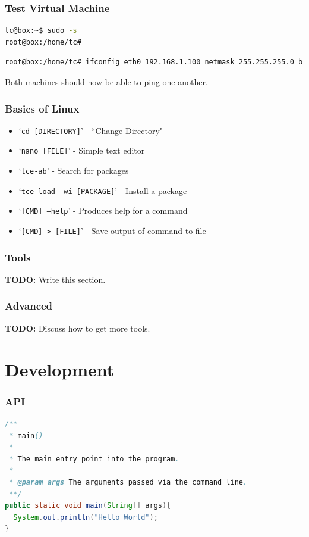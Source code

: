 \documentclass[10pt]{beamer}
\begin{document}
  \begin{frame}[fragile=singleslide]
    \frametitle{Test Virtual Machine}
    \centering
    \begin{lstlisting}[caption=Root Access,language=Bash]
tc@box:~$ sudo -s
root@box:/home/tc#
    \end{lstlisting}
    \begin{lstlisting}[caption=Setup Netork,language=Bash]
root@box:/home/tc# ifconfig eth0 192.168.1.100 netmask 255.255.255.0 broadcast 192.168.1.255 up
    \end{lstlisting}
    Both machines should now be able to ping one another.
  \end{frame}
  \begin{frame}
    \frametitle{Basics of Linux}
    \begin{itemize}
      \item `\texttt{cd [DIRECTORY]}' - ``Change Directory"
      \item `\texttt{nano [FILE]}' - Simple text editor
      \item `\texttt{tce-ab}' - Search for packages
      \item `\texttt{tce-load -wi [PACKAGE]}' - Install a package
      \item `\texttt{[CMD] --help}' - Produces help for a command
      \item `\texttt{[CMD] > [FILE]}' - Save output of command to file
    \end{itemize}
  \end{frame}
  \begin{frame}
    \frametitle{Tools}
    \textbf{TODO:} Write this section.
  \end{frame}
  \begin{frame}
    \frametitle{Advanced}
    \textbf{TODO:} Discuss how to get more tools.
  \end{frame}
  \section[Dev]{Development}
  \begin{frame}[fragile=singleslide]
    \frametitle{API}
    \begin{lstlisting}[caption=Java Hello World,language=Java]
/**
 * main()
 *
 * The main entry point into the program.
 *
 * @param args The arguments passed via the command line.
 **/
public static void main(String[] args){
  System.out.println("Hello World");
}
    \end{lstlisting}
  \end{frame}
\end{document}
